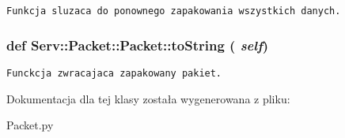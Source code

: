 \footnotesize\begin{verbatim}Funkcja sluzaca do ponownego zapakowania wszystkich danych.\end{verbatim}
\normalsize
 \hypertarget{class_serv_1_1_packet_1_1_packet_2738b48c8c177150338082c936c823dc}{
\subsubsection[{toString}]{\setlength{\rightskip}{0pt plus 5cm}def Serv::Packet::Packet::toString ( {\em self})}}
\label{class_serv_1_1_packet_1_1_packet_2738b48c8c177150338082c936c823dc}




\footnotesize\begin{verbatim}Funckcja zwracajaca zapakowany pakiet.\end{verbatim}
\normalsize
 

Dokumentacja dla tej klasy została wygenerowana z pliku:\begin{CompactItemize}
\item 
Packet.py\end{CompactItemize}
